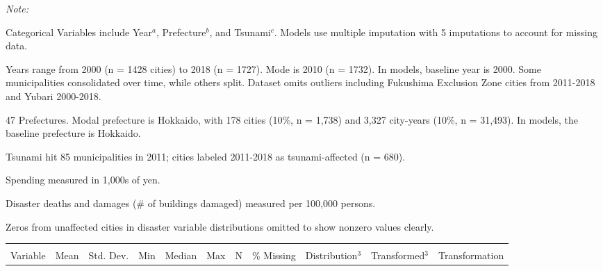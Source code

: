\documentclass[preprint, 3p,
authoryear]{elsarticle} %
\begin{document}
\newpage
\begin{landscape}

\renewcommand{\baselinestretch}{0.5}\selectfont
\renewcommand{\arraystretch}{1.5}

\begingroup\fontsize{9}{11}\selectfont

\begin{ThreePartTable}
\begin{TableNotes}
\item \textit{Note: } 
\item Categorical Variables include Year$^{a}$, Prefecture$^{b}$, and Tsunami$^{c}$. Models use multiple imputation with 5 imputations to account for missing data.
\item[a] Years range from 2000 (n = 1428 cities) to 2018 (n = 1727). Mode is 2010 (n = 1732). In models, baseline year is 2000. Some municipalities consolidated over time, while others split. Dataset omits outliers including Fukushima Exclusion Zone cities from 2011-2018 and Yubari 2000-2018.
\item[b] 47 Prefectures. Modal prefecture is Hokkaido, with 178 cities (10\%, n = 1,738) and 3,327 city-years (10\%, n = 31,493). In models, the baseline prefecture is Hokkaido.
\item[c] Tsunami hit 85 municipalities in 2011; cities labeled 2011-2018 as tsunami-affected (n = 680).
\item[1] Spending measured in 1,000s of yen.
\item[2] Disaster deaths and damages (\# of buildings damaged) measured per 100,000 persons.
\item[3] Zeros from unaffected cities in disaster variable distributions omitted to show nonzero values clearly.
\end{TableNotes}
\begin{longtabu} to 
\caption{\label{tab:unnamed-chunk-10}Table A1: \textbf{Descriptive Statistics} \newline \normalsize31493 Japanese city-years (2000-2018)}\\
\toprule
{} &  &  \\
\cmidrule(l{3pt}r{3pt}){2-6} \cmidrule(l{3pt}r{3pt}){7-8}
Variable & Mean & Std. Dev. & Min & Median & Max & N & \% Missing & Distribution$^{3}$ & Transformed$^{3}$ & Transformation\\

\end{longtabu}
\end{ThreePartTable}
\end{landscape}
\end{document}
